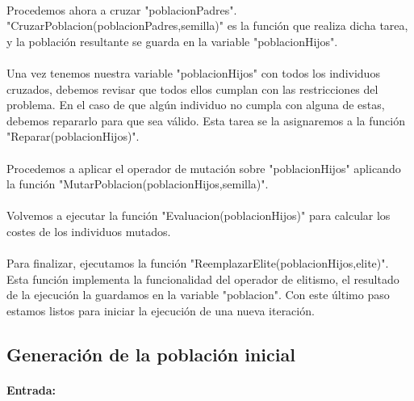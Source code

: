 	\paragraph{}Procedemos ahora a cruzar "poblacionPadres". "CruzarPoblacion(poblacionPadres,semilla)" es la función que realiza dicha tarea, y la población resultante se guarda en la variable "poblacionHijos".
	
	\paragraph{}Una vez tenemos nuestra variable "poblacionHijos" con todos los individuos cruzados, debemos revisar que todos ellos cumplan con las restricciones del problema. En el caso de que algún individuo no cumpla con alguna de estas, debemos repararlo para que sea válido. Esta tarea se la asignaremos a la función "Reparar(poblacionHijos)".
	
	\paragraph{}Procedemos a aplicar el operador de mutación sobre "poblacionHijos" aplicando la función "MutarPoblacion(poblacionHijos,semilla)".
	
	\paragraph{}Volvemos a ejecutar la función "Evaluacion(poblacionHijos)" para calcular los costes de los individuos mutados.
	
	\paragraph{}Para finalizar, ejecutamos la función "ReemplazarElite(poblacionHijos,elite)". Esta función implementa la funcionalidad del operador de elitismo, el resultado de la ejecución la guardamos en la variable "poblacion". Con este último paso estamos listos para iniciar la ejecución de una nueva iteración.
		
	\subsection{Generación de la población inicial}
	
	\paragraph{Entrada:}
	
